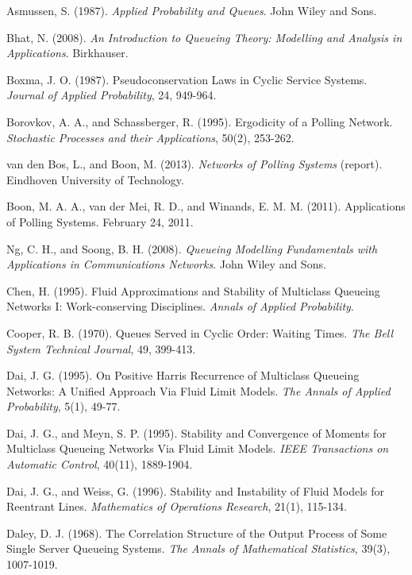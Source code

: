 \begin{thebibliography}{99}

 Asmussen, S. (1987). \textit{Applied Probability and Queues}. John Wiley and Sons.

 Bhat, N. (2008). \textit{An Introduction to Queueing Theory: Modelling and Analysis in Applications}. Birkhauser.

 Boxma, J. O. (1987). Pseudoconservation Laws in Cyclic Service Systems. \textit{Journal of Applied Probability}, 24, 949-964.

 Borovkov, A. A., and Schassberger, R. (1995). Ergodicity of a Polling Network. \textit{Stochastic Processes and their Applications}, 50(2), 253-262.

 van den Bos, L., and Boon, M. (2013). \textit{Networks of Polling Systems} (report). Eindhoven University of Technology.

 Boon, M. A. A., van der Mei, R. D., and Winands, E. M. M. (2011). Applications of Polling Systems. February 24, 2011.

 Ng, C. H., and Soong, B. H. (2008). \textit{Queueing Modelling Fundamentals with Applications in Communications Networks}. John Wiley and Sons.

 Chen, H. (1995). Fluid Approximations and Stability of Multiclass Queueing Networks I: Work-conserving Disciplines. \textit{Annals of Applied Probability}.

 Cooper, R. B. (1970). Queues Served in Cyclic Order: Waiting Times. \textit{The Bell System Technical Journal}, 49, 399-413.

 Dai, J. G. (1995). On Positive Harris Recurrence of Multiclass Queueing Networks: A Unified Approach Via Fluid Limit Models. \textit{The Annals of Applied Probability}, 5(1), 49-77.

 Dai, J. G., and Meyn, S. P. (1995). Stability and Convergence of Moments for Multiclass Queueing Networks Via Fluid Limit Models. \textit{IEEE Transactions on Automatic Control}, 40(11), 1889-1904.

 Dai, J. G., and Weiss, G. (1996). Stability and Instability of Fluid Models for Reentrant Lines. \textit{Mathematics of Operations Research}, 21(1), 115-134.

 Daley, D. J. (1968). The Correlation Structure of the Output Process of Some Single Server Queueing Systems. \textit{The Annals of Mathematical Statistics}, 39(3), 1007-1019.


\end{thebibliography}
